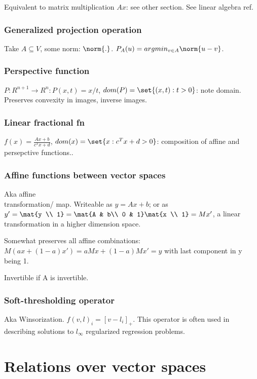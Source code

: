 \documentclass[oneside, article]{memoir}
\begin{document}
Equivalent to matrix multiplication $Ax$: see other section. See linear algebra ref.


\subsection{Generalized projection operation}
Take $A \subseteq V$, some norm: $\norm{.}$. $P_A(u) = argmin_{v \in A} \norm{u-v}$.

\subsection{Perspective function}
$P:R^{n+1} \to  R^n : P(x, t) = x/t$, $dom(P) = \set{(x, t): t>0}$: note domain. Preserves convexity in images, inverse images.

\subsection{Linear fractional fn}
$f(x) = \frac{Ax+b}{c^{T}x +d}$, $dom(x) = \set{x: c^{T}x +d>0}$: composition of affine and persepctive functions..

\subsection{Affine functions between vector spaces}
Aka affine \\
transformation/ map.  Writeable as $ y= Ax + b$; or as $y' = \mat{y \\ 1} = \mat{A & b\\ 0  & 1} \mat{x \\ 1} = Mx'$, a linear transformation in a higher dimension space.

Somewhat preserves all affine combinations: $M(ax + (1-a) x') = aMx+(1-a)Mx' = y$ with last component in y being 1.

Invertible if A is invertible.

\subsection{Soft-thresholding operator}
Aka Winsorization. $f(v, l)_i = [v-l_i]_+$. This operator is often used in describing solutions to $l_\infty$ regularized regression problems.

\chapter{Relations over vector spaces}
\end{document}
